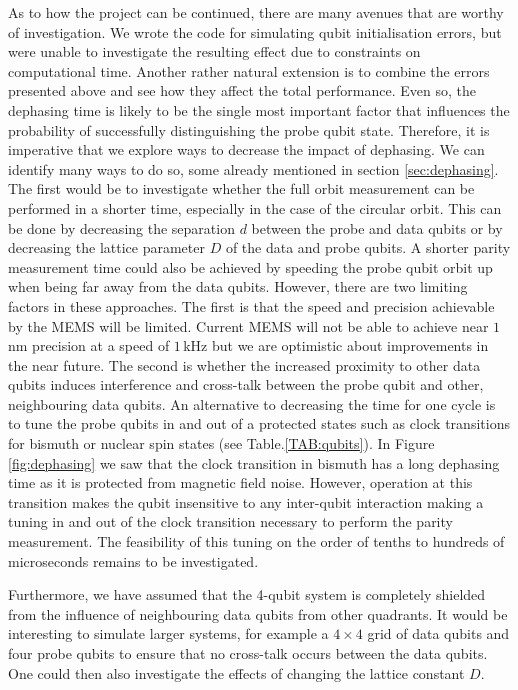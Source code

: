As to how the project can be continued, there are many avenues that are worthy of investigation. We wrote the code for simulating qubit initialisation errors, but were unable to investigate the resulting effect due to constraints on computational time. Another rather natural extension is to combine the errors presented above and see how they affect the total performance. Even so, the dephasing time is likely to be the single most important factor that influences the probability of successfully distinguishing the probe qubit state. Therefore, it is imperative that we explore ways to decrease the impact of dephasing. We can identify many ways to do so, some already mentioned in section \ref{sec:dephasing}. The first would be to investigate whether the full orbit measurement can be performed in a shorter time, especially in the case of the circular orbit. This can be done by decreasing the separation $d$ between the probe and data qubits or by decreasing the lattice parameter $D$ of the data and probe qubits. A shorter parity measurement time could also be achieved by speeding the probe qubit orbit up when being far away from the data qubits. 
However, there are two limiting factors in these approaches. The first is that the speed and precision achievable by the MEMS will be limited. Current MEMS will not be able to achieve near $1\, $nm precision at a speed of $1\, $kHz \cite{Koo2012,Chu2003} but we are optimistic about improvements in the near future. The second is whether the increased proximity to other data qubits induces interference and cross-talk between the probe qubit and other, neighbouring data qubits. 
An alternative to decreasing the time for one cycle is to tune the probe qubits in and out of a protected states such as clock transitions for bismuth or nuclear spin states (see Table.\@ \ref{TAB:qubits}). In Figure \ref{fig:dephasing} we saw that the clock transition in bismuth has a long dephasing time as it is protected from magnetic field noise. However, operation at this transition makes the qubit insensitive to any inter-qubit interaction making a tuning in and out of the clock transition necessary to perform the parity measurement. The feasibility of this tuning on the order of tenths to hundreds of microseconds remains to be investigated.


Furthermore, we have assumed that the 4-qubit system is completely shielded from the influence of neighbouring data qubits from other quadrants. It would be interesting to simulate larger systems, for example a $4\times 4$ grid of data qubits and four probe qubits to ensure that no cross-talk occurs between the data qubits. One could then also investigate the effects of changing the lattice constant $D$. 

